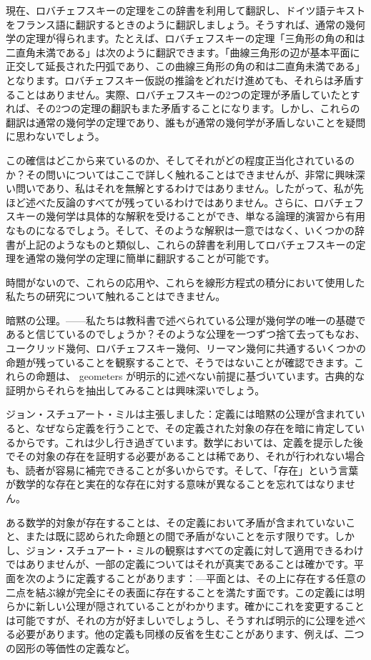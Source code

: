 \documentclass[a4paper,11pt,openany]{ltjsbook}
\begin{document}
現在、ロバチェフスキーの定理をこの辞書を利用して翻訳し、ドイツ語テキストをフランス語に翻訳するときのように翻訳しましょう。そうすれば、通常の幾何学の定理が得られます。たとえば、ロバチェフスキーの定理「三角形の角の和は二直角未満である」は次のように翻訳できます。「曲線三角形の辺が基本平面に正交して延長された円弧であり、この曲線三角形の角の和は二直角未満である」となります。ロバチェフスキー仮説の推論をどれだけ進めても、それらは矛盾することはありません。実際、ロバチェフスキーの2つの定理が矛盾していたとすれば、その2つの定理の翻訳もまた矛盾することになります。しかし、これらの翻訳は通常の幾何学の定理であり、誰もが通常の幾何学が矛盾しないことを疑問に思わないでしょう。

この確信はどこから来ているのか、そしてそれがどの程度正当化されているのか？その問いについてはここで詳しく触れることはできませんが、非常に興味深い問いであり、私はそれを無解とするわけではありません。したがって、私が先ほど述べた反論のすべてが残っているわけではありません。さらに、ロバチェフスキーの幾何学は具体的な解釈を受けることができ、単なる論理的演習から有用なものになるでしょう。そして、そのような解釈は一意ではなく、いくつかの辞書が上記のようなものと類似し、これらの辞書を利用してロバチェフスキーの定理を通常の幾何学の定理に簡単に翻訳することが可能です。

時間がないので、これらの応用や、これらを線形方程式の積分において使用した私たちの研究について触れることはできません。

暗黙の公理。——私たちは教科書で述べられている公理が幾何学の唯一の基礎であると信じているのでしょうか？そのような公理を一つずつ捨て去ってもなお、ユークリッド幾何、ロバチェフスキー幾何、リーマン幾何に共通するいくつかの命題が残っていることを観察することで、そうではないことが確認できます。これらの命題は、 geometers が明示的に述べない前提に基づいています。古典的な証明からそれらを抽出してみることは興味深いでしょう。

ジョン・スチュアート・ミルは主張しました：定義には暗黙の公理が含まれていると、なぜなら定義を行うことで、その定義された対象の存在を暗に肯定しているからです。これは少し行き過ぎています。数学においては、定義を提示した後でその対象の存在を証明する必要があることは稀であり、それが行われない場合も、読者が容易に補完できることが多いからです。そして、「存在」という言葉が数学的な存在と実在的な存在に対する意味が異なることを忘れてはなりません。

ある数学的対象が存在することは、その定義において矛盾が含まれていないこと、または既に認められた命題との間で矛盾がないことを示す限りです。しかし、ジョン・スチュアート・ミルの観察はすべての定義に対して適用できるわけではありませんが、一部の定義についてはそれが真実であることは確かです。平面を次のように定義することがあります：—平面とは、その上に存在する任意の二点を結ぶ線が完全にその表面に存在することを満たす面です。この定義には明らかに新しい公理が隠されていることがわかります。確かにこれを変更することは可能ですが、それの方が好ましいでしょうし、そうすれば明示的に公理を述べる必要があります。他の定義も同様の反省を生むことがあります、例えば、二つの図形の等価性の定義など。
\end{document}
